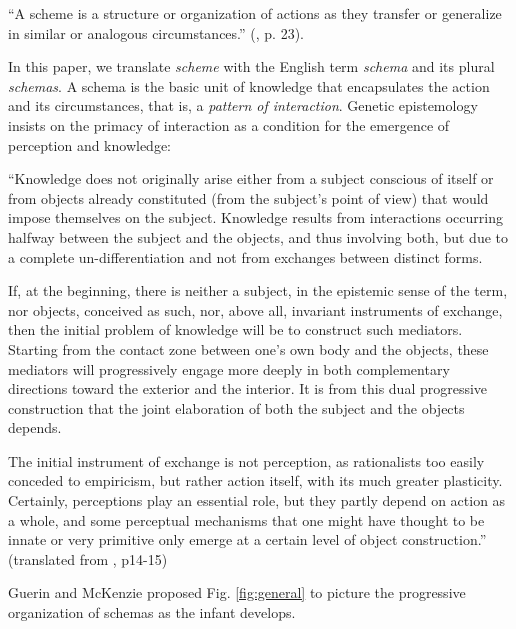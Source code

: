 \documentclass[runningheads]{llncs}
\begin{document}
\begin{adjustwidth}{1cm}{1cm}
``A scheme is a structure or organization of actions as they transfer or generalize in similar or analogous circumstances.'' 
(\cite{piaget_naissance_1998}, p. 23).
\\ 
\end{adjustwidth}

In this paper, we translate \textit{scheme} with the English term \textit{schema} and its plural \textit{schemas}. 
A schema is the basic unit of knowledge that encapsulates the action and its circumstances, that is, a \textit{pattern of interaction}. 
Genetic epistemology insists on the primacy of interaction as a condition for the emergence of perception and knowledge:
\\

\begin{adjustwidth}{1cm}{1cm}
``Knowledge does not originally arise either from a subject conscious of itself or from objects already constituted (from the subject's point of view) that would impose themselves on the subject. 
Knowledge results from interactions occurring halfway between the subject and the objects, and thus involving both, but due to a complete un-differentiation and not from exchanges between distinct forms.

If, at the beginning, there is neither a subject, in the epistemic sense of the term, nor objects, conceived as such, nor, above all, invariant instruments of exchange, then the initial problem of knowledge will be to construct such mediators. 
Starting from the contact zone between one's own body and the objects, these mediators will progressively engage more deeply in both complementary directions toward the exterior and the interior. 
It is from this dual progressive construction that the joint elaboration of both the subject and the objects depends.

The initial instrument of exchange is not perception, as rationalists too easily conceded to empiricism, but rather action itself, with its much greater plasticity. 
Certainly, perceptions play an essential role, but they partly depend on action as a whole, and some perceptual mechanisms that one might have thought to be innate or very primitive only emerge at a certain level of object construction.'' (translated from \cite{piaget_lepistemologie_2011}, p14-15)
\\

\end{adjustwidth}


Guerin and McKenzie \cite{guerin_survey_2013} proposed Fig. \ref{fig:general} to picture the progressive organization of schemas as the infant develops.
\end{document}
